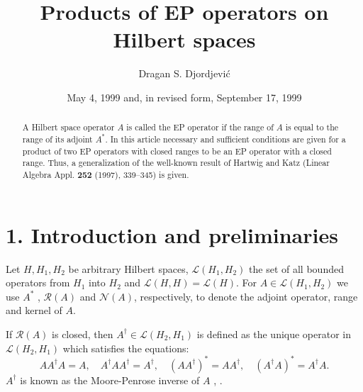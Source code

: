 \documentclass{proc-l}
\theoremstyle{plain}
\theoremstyle{remark}
\theoremstyle{definition}
\begin{document}
\title{Products of EP operators on Hilbert spaces}
\author{Dragan S. Djordjevi\'{c}}
\address{Department of Mathematics, Faculty of Philosophy, University of Ni%
\v{s}, \'{C}irila i\break Metodija 2, 18000 Ni\v{s}, Yugoslavia}
\date{May 4, 1999 and, in revised form, September 17, 1999}

\begin{abstract}
A Hilbert space operator $A$ is called the EP operator if the range of $A$
is equal to the range of its adjoint $A^{*}$. In this article necessary and
sufficient conditions are given for a product of two EP operators with
closed ranges to be an EP operator with a closed range. Thus, a
generalization of the well-known result of Hartwig and Katz (Linear Algebra
Appl. \textbf{252 } (1997), 339--345) is given.
\end{abstract}

\maketitle


\section*{1. Introduction and preliminaries}

Let $H,H_{1},H_{2}$ be arbitrary Hilbert spaces, $\mathcal{L} (H_{1},H_{2})$
the set of all  bounded operators from $H_{1}$ into $H_{2}$ and $\mathcal{L}
(H,H)=\mathcal{L} (H)$.  For $A\in \mathcal{L} (H_{1},H_{2})$ we use $A^{*}$%
, $\mathcal{R} (A)$ and $\mathcal{N} (A)$, respectively, to denote the
adjoint operator, range and kernel of $A$.

If $\mathcal{R} (A)$ is closed, then $A^{\dag }\in \mathcal{L} (H_{2},H_{1})$
is defined as the unique operator in $\mathcal{L} (H_{2},H_{1})$ which
satisfies the equations: 
\begin{equation*}
AA^{\dag }A=A,\quad A^{\dag }AA^{\dag }=A^{\dag },\quad (AA^{\dag
})^{*}=AA^{\dag },\quad (A^{\dag }A)^{*}=A^{\dag }A.
\end{equation*}
$A^{\dag }$ is known as the Moore-Penrose inverse of $A$ \cite{2}, \cite{4}.
\end{document}
